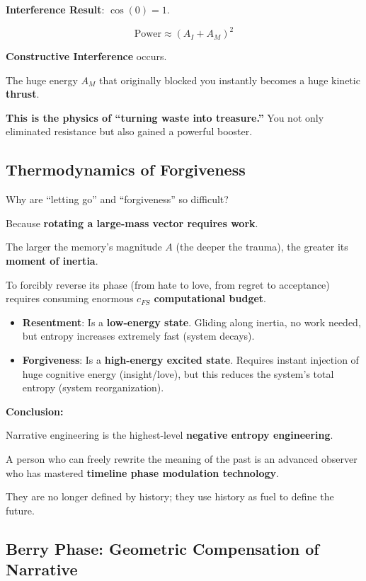 \textbf{Interference Result}: $\cos(0) = 1$.

\[\text{Power} \approx (A_I + A_M)^2\]

\textbf{Constructive Interference} occurs.

The huge energy $A_M$ that originally blocked you instantly becomes a huge kinetic \textbf{thrust}.

\textbf{This is the physics of ``turning waste into treasure.''} You not only eliminated resistance but also gained a powerful booster.

\subsection{Thermodynamics of Forgiveness}

Why are ``letting go'' and ``forgiveness'' so difficult?

Because \textbf{rotating a large-mass vector requires work}.

The larger the memory's magnitude $A$ (the deeper the trauma), the greater its \textbf{moment of inertia}.

To forcibly reverse its phase (from hate to love, from regret to acceptance) requires consuming enormous \textbf{$c_{FS}$ computational budget}.

\begin{itemize}
\item \textbf{Resentment}: Is a \textbf{low-energy state}. Gliding along inertia, no work needed, but entropy increases extremely fast (system decays).

\item \textbf{Forgiveness}: Is a \textbf{high-energy excited state}. Requires instant injection of huge cognitive energy (insight/love), but this reduces the system's total entropy (system reorganization).
\end{itemize}

\textbf{Conclusion:}

Narrative engineering is the highest-level \textbf{negative entropy engineering}.

A person who can freely rewrite the meaning of the past is an advanced observer who has mastered \textbf{timeline phase modulation technology}.

They are no longer defined by history; they use history as fuel to define the future.

\subsection{Berry Phase: Geometric Compensation of Narrative}

